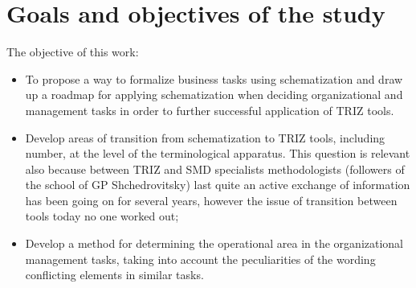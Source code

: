 \section{Goals and objectives of the study}
The objective of this work:
\begin{itemize}
\item To propose a way to formalize business tasks using schematization and
  draw up a roadmap for applying schematization when deciding organizational
  and management tasks in order to further successful application of TRIZ
  tools.
\item Develop areas of transition from schematization to TRIZ tools, including
  number, at the level of the terminological apparatus. This question is
  relevant also because between TRIZ and SMD specialists methodologists
  (followers of the school of GP Shchedrovitsky) last quite an active exchange
  of information has been going on for several years, however the issue of
  transition between tools today no one worked out;
\item Develop a method for determining the operational area in the
  organizational management tasks, taking into account the peculiarities of
  the wording conflicting elements in similar tasks.
\end{itemize}
